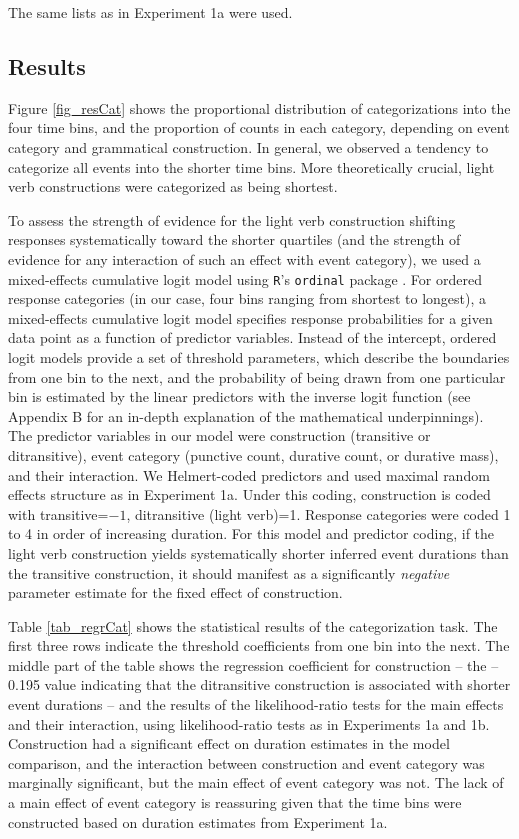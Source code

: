 \documentclass[review,12pt,authoryear]{elsarticle}
\newcommand*{\sectionformat}{\centering}
\begin{document}
The same lists as in Experiment 1a were used.
\subsection*{\sectionformat Results}\label{sec_resCat}

Figure \ref{fig_resCat} shows the proportional distribution of categorizations into the four time bins, and the proportion of counts in each category, depending on event category and grammatical construction. In general, we observed a tendency to categorize all events into the shorter time bins. More theoretically crucial, light verb constructions were categorized as being shortest.

To assess the strength of evidence for the light verb construction shifting responses systematically toward the shorter quartiles (and the strength of evidence for any interaction of such an effect with event category), we used a mixed-effects cumulative logit model using \texttt{R}'s \texttt{ordinal} package \citep{Christensen2015}.  For ordered response categories (in our case, four bins ranging from shortest to longest), a mixed-effects cumulative logit model specifies response probabilities for a given data point as a function of predictor variables. Instead of the intercept, ordered logit models provide a set of threshold parameters, which describe the boundaries from one bin to the next, and the probability of being drawn from one particular bin is estimated by the linear predictors with the inverse logit function (see Appendix B for an in-depth explanation of the mathematical underpinnings). The predictor variables in our model were construction (transitive or ditransitive), event category (punctive count, durative count, or durative mass), and their interaction. We Helmert-coded predictors and used maximal random effects structure as in Experiment 1a.  Under this coding, construction is coded with transitive=$-1$, ditransitive (light verb)=1.  Response categories were coded 1 to 4 in order of increasing duration.  For this model and predictor coding, if the light verb construction yields systematically shorter inferred event durations than the transitive construction, it should manifest as a significantly \emph{negative} parameter estimate for the fixed effect of construction.

Table \ref{tab_regrCat} shows the statistical results of the categorization task. The first three rows indicate the threshold coefficients from one bin into the next. The middle part of the table shows the regression coefficient for construction -- the --0.195 value indicating that the ditransitive construction is associated with shorter event durations -- and the results of the likelihood-ratio tests for the main effects and their interaction, using likelihood-ratio tests as in Experiments 1a and 1b.  Construction had a significant effect on duration estimates in the model comparison, and the interaction between construction and event category was marginally significant, but the main effect of event category was not. The lack of a main effect of event category is reassuring given that the time bins were constructed based on duration estimates from Experiment 1a. 
\end{document}
